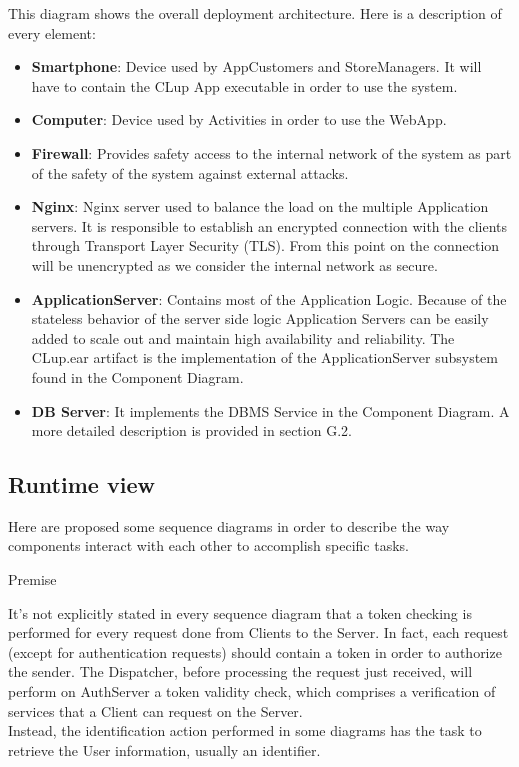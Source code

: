 This diagram shows the overall deployment architecture. Here is a description of every element:\\
\begin{itemize}
    \item \textbf{Smartphone}: Device used by AppCustomers and StoreManagers. It will have to contain the CLup App executable in order to use the system.
    
    \item \textbf{Computer}: Device used by Activities in order to use the WebApp.
    
    \item \textbf{Firewall}: Provides safety access to the internal network of the system as part of the safety of the system against external attacks.
    
    \item \textbf{Nginx}: Nginx server used to balance the load on the multiple Application servers. It is responsible to establish an encrypted connection with the clients through Transport Layer Security (TLS). From this point on the connection will be unencrypted as we consider the internal network as secure.
    
    \item \textbf{ApplicationServer}: Contains most of the Application Logic. Because of the stateless behavior of the server side logic Application Servers can be easily added to scale out and maintain high availability and reliability. The CLup.ear artifact is the implementation of the ApplicationServer subsystem found in the Component Diagram.
    
    \item \textbf{DB Server}: It implements the DBMS Service in the Component Diagram. A more detailed description is provided in section G.2.
\end{itemize}

\newpage

\subsection{Runtime view}
Here are proposed some sequence diagrams in order to describe the way components interact with each other to accomplish specific tasks.\\

\begin{center} 
Premise\\
\end{center}
It’s not explicitly stated in every sequence diagram that a token checking is performed for every request done from Clients to the Server. In fact, each request (except for authentication requests) should contain a token in order to authorize the sender. The Dispatcher, before processing the request just received, will perform on AuthServer a token validity check, which comprises a verification of services that a Client can request on the Server. \\
Instead, the identification action performed in some diagrams has the task to retrieve the User information, usually an identifier.\\
